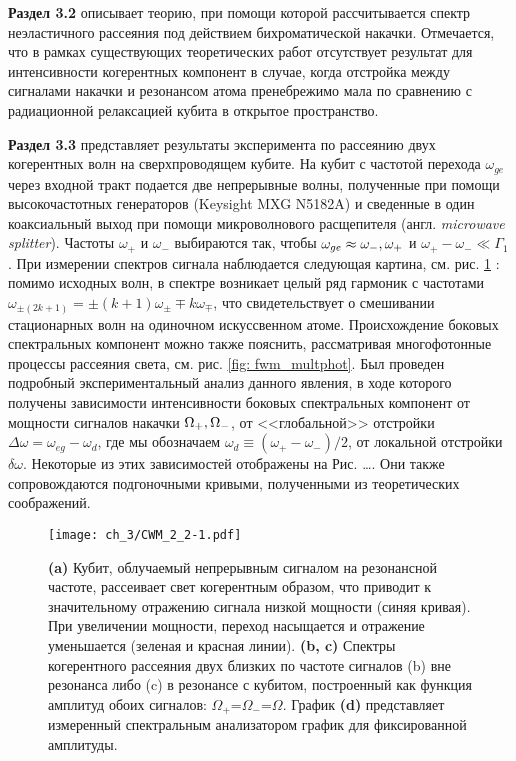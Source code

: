 \textbf{Раздел 3.2} описывает теорию, при помощи которой рассчитывается спектр неэластичного рассеяния под действием бихроматической накачки. Отмечается, что в рамках существующих теоретических работ отсутствует результат для интенсивности когерентных компонент в случае, когда отстройка между сигналами накачки и резонансом атома пренебрежимо мала по сравнению с радиационной релаксацией кубита в открытое пространство. 

\textbf{Раздел 3.3} представляет результаты эксперимента по рассеянию двух когерентных волн на сверхпроводящем кубите. На кубит с частотой перехода $\omega_{ge}$ через входной тракт подается две непрерывные волны, полученные при помощи высокочастотных генераторов (Keysight MXG N5182A) и сведенные в один коаксиальный выход при помощи микроволнового расщепителя (англ. \textit{microwave splitter}). Частоты $\omega_+$ и $\omega_-$ выбираются так, чтобы $\omega_{ge}\approx\omega_-,\space\omega_+$ и $\omega_+-\omega_- \ll \Gamma_1$. При измерении спектров сигнала наблюдается следующая картина, см. рис. \ref{fig: fwm_qubit} : помимо исходных волн, в спектре возникает целый ряд гармоник с частотами $\omega_{\pm(2k+1)}=\pm(k+1)\omega_{\pm}\mp k\omega_{\mp}$, что свидетельствует о смешивании стационарных волн на одиночном искуссвенном атоме. Происхождение боковых спектральных компонент можно также пояснить, рассматривая многофотонные процессы рассеяния света, см. рис. \ref{fig: fwm_multphot}. Был проведен подробный экспериментальный анализ данного явления, в ходе которого получены зависимости интенсивности боковых спектральных компонент от мощности сигналов накачки $\Omega_+,\space\Omega_-$, от <<глобальной>> отстройки $\Delta\omega = \omega_{eg}-\omega_d$, где мы обозначаем $\omega_d\equiv(\omega_+-\omega_-)/2$, от локальной отстройки $\delta\omega$. Некоторые из этих зависимостей отображены на Рис. \dots. Они также сопровождаются подгоночными кривыми, полученными из теоретических соображений. 
\begin{figure}[htb]\center
	\texttt{[image: ch\_3/CWM\_2\_2-1.pdf]}
	\caption{\textbf{(a)} Кубит, облучаемый непрерывным сигналом на резонансной частоте, рассеивает свет когерентным образом, что приводит к значительному отражению сигнала низкой мощности (синяя кривая). При увеличении мощности, переход насыщается и отражение уменьшается (зеленая и красная линии). \textbf{(b, c)} Спектры когерентного рассеяния двух близких по частоте сигналов (b) вне резонанса либо (c) в резонансе с кубитом, построенный как функция амплитуд обоих сигналов: $\Omega_+$=$\Omega_-$=$\Omega$. График \textbf{(d)} представляет измеренный спектральным анализатором график для фиксированной амплитуды.}
	\label{fig: fwm_qubit}
\end{figure}

